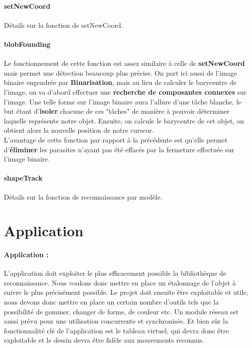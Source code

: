 \documentclass{report}
\begin{document}
						\paragraph{setNewCoord} \paragraph{}
						Détails sur la fonction de setNewCoord.
						\paragraph{blobFounding} \paragraph{}
						Le fonctionnement de cette fonction est assez similaire à celle de \textbf{setNewCoord} mais permet une détection beaucoup plus précise. On part ici aussi de l'image binaire engendrée par \textbf{Binarisation}, mais au lieu de calculer le barycentre de l'image, on va d'abord effectuer une  \textbf{recherche de composantes connexes} sur l'image. Une telle forme sur l'image binaire aura l'allure d'une tâche blanche, le but étant d'\textbf{isoler} chacune de ces "tâches" de manière à pouvoir déterminer laquelle représente notre objet. Ensuite, on calcule le barycentre de cet objet, on obtient alors la nouvelle position de notre curseur.\\
						L'avantage de cette fonction par rapport à la précédente est qu'elle permet d'\textbf{éliminer} les parasites n'ayant pas été effacés par la fermeture effectuée sur l'image binaire.
						\paragraph{shapeTrack} \paragraph{}
						Détails sur la fonction de reconnaissance par modèle.
						
		\section{Application}
	\paragraph{Application :\\}
L'application doit exploiter le plus efficacement possible la bibliothèque de reconnaissance. Nous voulons donc mettre en place un étalonnage de l'objet à suivre le plus précisément possible. Le projet doit ensuite être exploitable et utile, nous devons donc mettre en place un certain nombre d'outils tels que la possibilité de gommer, changer de forme, de couleur etc. 
Un module réseau est aussi prévu pour une utilisation concurrente et synchronisée. Et bien sûr la fonctionnalité clé de l'application est le tableau virtuel, qui devra donc être exploitable et le dessin devra être fidèle aux mouvements reconnus.
\end{document}
